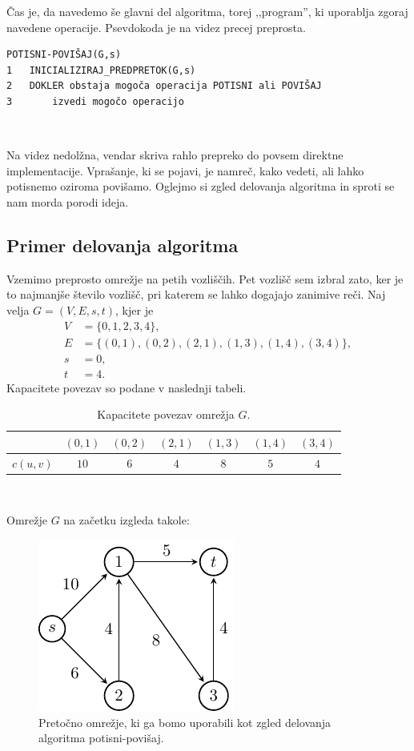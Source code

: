 \documentclass[mat1]{fmfdelo}
\begin{document}
Čas je, da navedemo še glavni del algoritma, torej ,,program'', ki uporablja zgoraj navedene operacije. Psevdokoda je na videz precej preprosta.\\

\begin{verbatim}
POTISNI-POVIŠAJ(G,s)
1   INICIALIZIRAJ_PREDPRETOK(G,s)
2   DOKLER obstaja mogoča operacija POTISNI ali POVIŠAJ
3       izvedi mogočo operacijo
\end{verbatim}~

Na videz nedolžna, vendar skriva rahlo prepreko do povsem direktne implementacije. Vprašanje, ki se pojavi, je namreč, kako vedeti, ali lahko potisnemo oziroma povišamo. Oglejmo si zgled delovanja algoritma in sproti se nam morda porodi ideja.\\

\subsection{Primer delovanja algoritma}

Vzemimo preprosto omrežje na petih vozliščih. Pet vozlišč sem izbral zato, ker je to najmanjše število vozlišč, pri katerem se lahko dogajajo zanimive reči. Naj velja $G = (V, E, s, t)$, kjer je
\begin{align*}
	V &= \{0,1,2,3,4\},\\
	E &= \{(0,1), (0,2), (2,1), (1,3), (1,4), (3,4)\},\\
	s &= 0,\\
	t &= 4.
\end{align*}
Kapacitete povezav so podane v naslednji tabeli.

\begin{table}[h!]
\centering
\caption{Kapacitete povezav omrežja $G$.}
\begin{tabular}{|l|c|c|c|c|c|c|}
\hline
         & $(0,1)$ & $(0,2)$ & $(2,1)$ & $(1,3)$ & $(1,4)$ & $(3,4)$\\ \hline
$c(u,v)$ &   $10$  &   $6$   &   $4$   &   $8$   &   $5$   &   $4$  \\ \hline
\end{tabular}
\end{table}~

Omrežje $G$ na začetku izgleda takole:

\begin{figure}[H]
  \centering
  \includegraphics{images/graf2-1.pdf}
  \caption{Pretočno omrežje, ki ga bomo uporabili kot zgled delovanja algoritma potisni-povišaj.}
\end{figure}
\end{document}
